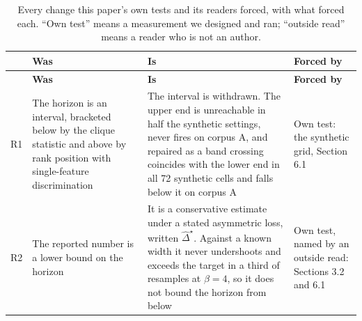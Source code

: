 \documentclass[twoside,11pt]{article}
\begin{document}
\begingroup\small
\begin{longtable}{@{}
  >{\raggedright\arraybackslash}p{}
  >{\raggedright\arraybackslash}p{}
  >{\raggedright\arraybackslash}p{}
  >{\raggedright\arraybackslash}p{}@{}}
\caption{Every change this paper's own tests and its readers forced, with what forced each. ``Own test'' means a measurement we designed and ran; ``outside read'' means a reader who is not an author.}\label{tab:B-1}\\
\toprule
\begin{minipage}[b]{\linewidth}\raggedright
\end{minipage} & \begin{minipage}[b]{\linewidth}\raggedright
\textbf{Was}
\end{minipage} & \begin{minipage}[b]{\linewidth}\raggedright
\textbf{Is}
\end{minipage} & \begin{minipage}[b]{\linewidth}\raggedright
\textbf{Forced by}
\end{minipage} \\
\midrule
\endfirsthead
\toprule
\begin{minipage}[b]{\linewidth}\raggedright
\end{minipage} & \begin{minipage}[b]{\linewidth}\raggedright
\textbf{Was}
\end{minipage} & \begin{minipage}[b]{\linewidth}\raggedright
\textbf{Is}
\end{minipage} & \begin{minipage}[b]{\linewidth}\raggedright
\textbf{Forced by}
\end{minipage} \\
\midrule
\endhead
\bottomrule
\endlastfoot
R1 & The horizon is an interval, bracketed below by the clique statistic and above by rank position with single-feature discrimination & The interval is withdrawn. The upper end is unreachable in half the synthetic settings, never fires on corpus A, and repaired as a band crossing coincides with the lower end in all 72 synthetic cells and falls below it on corpus A & Own test: the synthetic grid, Section 6.1 \\
R2 & The reported number is a lower bound on the horizon & It is a conservative estimate under a stated asymmetric loss, written \({\widehat{\Delta}}^{\star}\). Against a known width it never undershoots and exceeds the target in a third of resamples at \(\beta = 4\), so it does not bound the horizon from below & Own test, named by an outside read: Sections 3.2 and 6.1 \\

\end{longtable}
\end{document}
